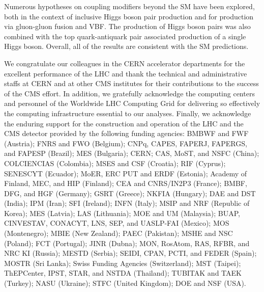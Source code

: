 \documentclass[11pt,a4paper,cmspaper,final,collab]{cms-tdr}
\begin{document}
Numerous hypotheses on coupling modifiers beyond the 
SM have been explored, both
in the context of inclusive Higgs boson pair production and for \HH
production via gluon-gluon fusion and VBF. 
The production of Higgs boson pairs was also combined with the top
quark-antiquark pair associated production of a single Higgs boson. 
Overall, all of the results are consistent with the SM predictions.


\begin{acknowledgments}
  We congratulate our colleagues in the CERN accelerator departments for the excellent performance of the LHC and thank the technical and administrative staffs at CERN and at other CMS institutes for their contributions to the success of the CMS effort. In addition, we gratefully acknowledge the computing centers and personnel of the Worldwide LHC Computing Grid for delivering so effectively the computing infrastructure essential to our analyses. Finally, we acknowledge the enduring support for the construction and operation of the LHC and the CMS detector provided by the following funding agencies: BMBWF and FWF (Austria); FNRS and FWO (Belgium); CNPq, CAPES, FAPERJ, FAPERGS, and FAPESP (Brazil); MES (Bulgaria); CERN; CAS, MoST, and NSFC (China); COLCIENCIAS (Colombia); MSES and CSF (Croatia); RIF (Cyprus); SENESCYT (Ecuador); MoER, ERC PUT and ERDF (Estonia); Academy of Finland, MEC, and HIP (Finland); CEA and CNRS/IN2P3 (France); BMBF, DFG, and HGF (Germany); GSRT (Greece); NKFIA (Hungary); DAE and DST (India); IPM (Iran); SFI (Ireland); INFN (Italy); MSIP and NRF (Republic of Korea); MES (Latvia); LAS (Lithuania); MOE and UM (Malaysia); BUAP, CINVESTAV, CONACYT, LNS, SEP, and UASLP-FAI (Mexico); MOS (Montenegro); MBIE (New Zealand); PAEC (Pakistan); MSHE and NSC (Poland); FCT (Portugal); JINR (Dubna); MON, RosAtom, RAS, RFBR, and NRC KI (Russia); MESTD (Serbia); SEIDI, CPAN, PCTI, and FEDER (Spain); MOSTR (Sri Lanka); Swiss Funding Agencies (Switzerland); MST (Taipei); ThEPCenter, IPST, STAR, and NSTDA (Thailand); TUBITAK and TAEK (Turkey); NASU (Ukraine); STFC (United Kingdom); DOE and NSF (USA).
  

\end{acknowledgments}
\end{document}
